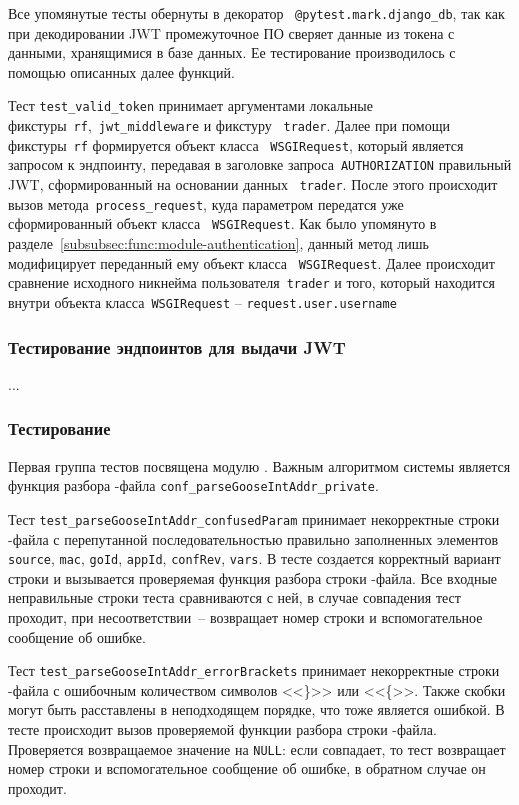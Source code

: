Все упомянутые тесты обернуты в декоратор ~\lstinline{@pytest.mark.django_db}, так как при декодировании JWT промежуточное ПО сверяет данные из токена с данными, хранящимися в базе данных.
Ее тестирование производилось с помощью описанных далее функций.

Тест \lstinline{test_valid_token} принимает аргументами локальные фикстуры~\lstinline{rf},~\lstinline{jwt_middleware} и фикстуру ~\lstinline{trader}.
Далее при помощи фикстуры~\lstinline{rf} формируется объект класса ~\lstinline{WSGIRequest}, который является запросом к эндпоинту, передавая в заголовке запроса~\lstinline{AUTHORIZATION} правильный JWT, сформированный на основании данных ~\lstinline{trader}.
После этого происходит вызов метода~\lstinline{process_request}, куда параметром передатся уже сформированный объект класса ~\lstinline{WSGIRequest}.
Как было упомянуто в разделе~\ref{subsubsec:func:module-authentication}, данный метод лишь модифицирует переданный ему объект класса ~\lstinline{WSGIRequest}.
Далее происходит сравнение исходного никнейма пользователя~\lstinline{trader} и того, который находится внутри объекта класса~\lstinline{WSGIRequest} -- \lstinline{request.user.username}

\subsubsection{Тестирование эндпоинтов для выдачи JWT}
...

\subsubsection{Тестирование}

Первая группа тестов посвящена модулю \moduleCfg. Важным алгоритмом системы является
функция разбора \cid-файла \lstinline{conf_parseGooseIntAddr_private}.

Тест \lstinline{test_parseGooseIntAddr_confusedParam} принимает некорректные строки \cid-файла с перепутанной последовательностью правильно заполненных элементов \lstinline{source}, \lstinline{mac}, \lstinline{goId}, \lstinline{appId}, \lstinline{confRev}, \lstinline{vars}.
В тесте создается корректный вариант строки и вызывается проверяемая функция разбора строки \cid-файла.
Все входные неправильные строки теста сравниваются с ней, в случае совпадения тест проходит, при несоответствии~-- возвращает номер строки и вспомогательное сообщение  об ошибке.

Тест \lstinline{test_parseGooseIntAddr_errorBrackets} принимает некорректные строки \cid-файла с ошибочным количеством символов <<\}>> или <<\{>>. Также скобки могут быть расставлены в неподходящем порядке, что тоже является ошибкой. В тесте происходит вызов проверяемой функции разбора строки \cid-файла. Проверяется возвращаемое значение на \lstinline{NULL}: если совпадает, то тест возвращает номер строки и вспомогательное сообщение об ошибке, в обратном случае он проходит.

